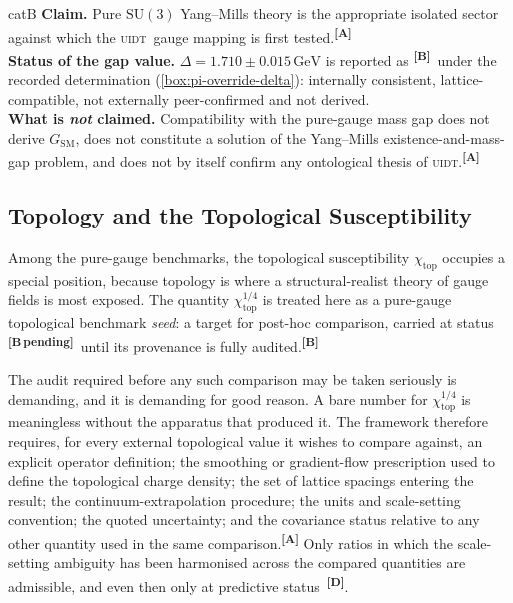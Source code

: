 \documentclass[12pt,a4paper,twoside]{article}
\theoremstyle{plain}
\theoremstyle{definition}
\theoremstyle{remark}
\newcommand{\UIDT}{\textsc{uidt}}
\newcommand{\GeV}{\,\mathrm{GeV}}
\newcommand{\catmark}[1]{\textsuperscript{\textsf{\textbf{[#1]}}}}
\newcommand{\Bpending}{\catmark{B\,pending}}
\newcommand{\DeltaGap}{1.710 \pm 0.015\GeV} %
\begin{document}
\begin{evidencebox}{catB}
\textbf{Claim.} Pure $\mathrm{SU}(3)$ Yang--Mills theory is the appropriate isolated sector against which the \UIDT\ gauge mapping is first
tested.\catmark{A}\\[0.3em]
\textbf{Status of the gap value.} $\Delta = \DeltaGap$ is reported as \catmark{B}\ under the recorded determination (\cref{box:pi-override-delta}): internally consistent, lattice-compatible, not externally peer-confirmed and not
derived.\\[0.3em]
\textbf{What is \emph{not} claimed.} Compatibility with the pure-gauge mass gap does not derive $G_{\mathrm{SM}}$, does not constitute a solution of the Yang--Mills existence-and-mass-gap problem, and does not by itself confirm any ontological thesis of \UIDT.\catmark{A}
\end{evidencebox}

\subsection{Topology and the Topological Susceptibility}
\label{subsec:topology-chi}

Among the pure-gauge benchmarks, the topological susceptibility $\chi_{\mathrm{top}}$ occupies a special position, because topology is where a structural-realist theory of gauge fields is most exposed. The quantity $\chi_{\mathrm{top}}^{1/4}$ is treated here as a pure-gauge topological benchmark \emph{seed}: a target for post-hoc comparison, carried at status \Bpending\ until its provenance is fully audited.\catmark{B}

The audit required before any such comparison may be taken seriously is demanding, and it is demanding for good reason. A bare number for $\chi_{\mathrm{top}}^{1/4}$ is meaningless without the apparatus that produced it. The framework therefore requires, for every external topological value it wishes to compare against, an explicit operator definition; the smoothing or gradient-flow prescription used to define the topological charge density; the set of lattice spacings entering the result; the continuum-extrapolation procedure; the units and scale-setting convention; the quoted uncertainty; and the covariance status relative to any other quantity used in the same comparison.\catmark{A} Only ratios in which the scale-setting ambiguity has been harmonised across the compared quantities are admissible, and even then only at predictive status~\catmark{D}.
\end{document}
